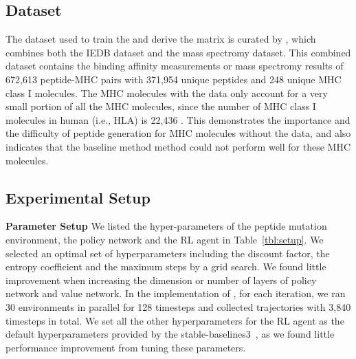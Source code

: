 \documentclass[letterpaper]{article}
\begin{document}
\subsection{Dataset}
\label{sec:experiments:dataset}

The dataset used to train the \mhcflurrynd and derive the \pwm matrix is curated by \cite{odonnell2020}, which combines both 
the IEDB dataset and the mass spectromy dataset.
%
This combined dataset contains the binding affinity measurements or mass spectromy results of 672,613 peptide-MHC pairs with 371,954 unique peptides and 
248 unique MHC class I molecules. 
%
The MHC molecules with the data only account for a very small portion of all the MHC molecules, since the number of MHC class I molecules in human (i.e., HLA)
is 22,436 \cite{Marsh2010}.
%
This demonstrates the importance and the difficulty of peptide generation for MHC molecules without the data, and also indicates that the baseline method \pwm 
method could not perform well for these MHC molecules.

\subsection{Experimental Setup}
\label{sec:experiments:setup}


\textbf{Parameter Setup} We listed the hyper-parameters of the peptide mutation environment, the policy network and the RL 
agent in Table~\ref{tbl:setup}.
%
We selected an optimal set of hyperparameters including the discount factor, the entropy coefficient and the maximum steps by a grid search.
%
We found little improvement when increasing the dimension or number of layers of policy network and value network.
%
In the implementation of \pepppo, for each iteration, we ran 30 environments in parallel for 128 timesteps and collected trajectories with 3,840 timesteps in total.
%
We set all the other hyperparameters for the RL agent as the default hyperparameters provided by the stable-baselines3~\cite{stable-baselines3}, as we found little performance 
improvement from tuning these parameters. 
\end{document}

